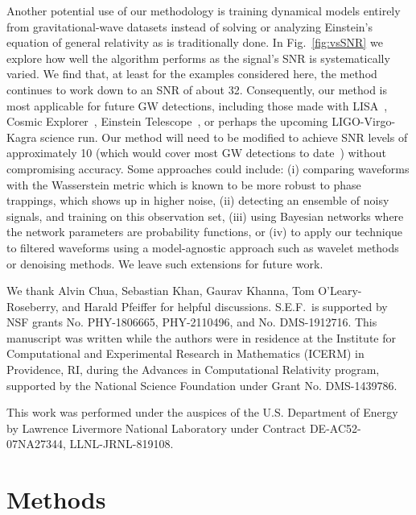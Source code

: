 \documentclass[ reprint,
nofootinbib,
 amsmath,amssymb,
 aps,
]{revtex4-2}
\begin{document}
Another potential use of our methodology is training dynamical models entirely from gravitational-wave datasets instead of solving or analyzing Einstein's equation of general relativity as is traditionally done. In Fig.~\ref{fig:vsSNR} we explore how well the algorithm performs as the signal's SNR is systematically varied. We find that, at least for the examples considered here, the method continues to work down to an SNR of about 32. Consequently, our method is most applicable for future GW detections, including those made with LISA~\cite{2017arXiv170200786A}, Cosmic Explorer~\cite{Evans:2016mbw}, Einstein Telescope~\cite{Hild:2010id}, or perhaps the upcoming LIGO-Virgo-Kagra science run. Our method will need to be modified to achieve SNR levels of approximately 10 (which would cover most GW detections to date~\cite{abbott2020gwtc}) without compromising accuracy. Some approaches could include: (i) comparing waveforms with the Wasserstein metric which is known to be more robust to phase trappings, which shows up in higher noise, (ii) detecting an ensemble of noisy signals, and training on this observation set, (iii) using Bayesian networks where the network parameters are probability functions, or (iv) to apply our technique to filtered waveforms using a model-agnostic approach such as wavelet methods or denoising methods. We leave such extensions for future work.






\bigskip
\begin{acknowledgments}
We thank Alvin Chua, Sebastian Khan, Gaurav Khanna, Tom O'Leary-Roseberry, and Harald Pfeiffer for helpful discussions.
S.E.F.\ is supported by NSF grants No. PHY-1806665, PHY-2110496, and No. DMS-1912716.
This manuscript was written while the authors were in residence at the Institute for Computational and Experimental Research in Mathematics (ICERM) in Providence, RI, during the Advances in Computational Relativity program, supported by the National Science Foundation under Grant No. DMS-1439786.

This work was performed under the auspices of the U.S. Department of Energy by Lawrence Livermore National Laboratory under Contract DE-AC52-07NA27344, LLNL-JRNL-819108.
\end{acknowledgments}

\appendix
\section{Methods} \label{sec:methods}
\end{document}
